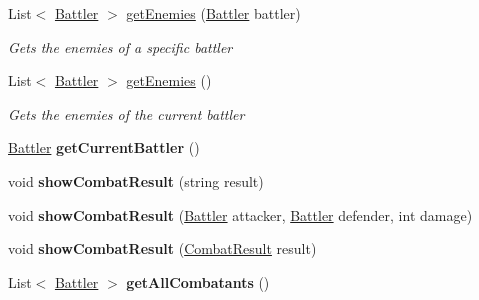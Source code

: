 \begin{DoxyCompactItemize}
\item 
List$<$ \hyperlink{class_simple_r_p_g_1_1_battler}{Battler} $>$ \hyperlink{class_simple_r_p_g_1_1_states_1_1_battle_state_a82c6a6de5de52d9586364607bb61d777}{get\-Enemies} (\hyperlink{class_simple_r_p_g_1_1_battler}{Battler} battler)
\begin{DoxyCompactList}\small\item\em Gets the enemies of a specific battler \end{DoxyCompactList}\item 
List$<$ \hyperlink{class_simple_r_p_g_1_1_battler}{Battler} $>$ \hyperlink{class_simple_r_p_g_1_1_states_1_1_battle_state_aafaee022fae4144c8606e7843db584fd}{get\-Enemies} ()
\begin{DoxyCompactList}\small\item\em Gets the enemies of the current battler \end{DoxyCompactList}\item 
\hypertarget{class_simple_r_p_g_1_1_states_1_1_battle_state_afea1b2b46a818c024abe7420daae1892}{\hyperlink{class_simple_r_p_g_1_1_battler}{Battler} {\bfseries get\-Current\-Battler} ()}\label{class_simple_r_p_g_1_1_states_1_1_battle_state_afea1b2b46a818c024abe7420daae1892}

\item 
\hypertarget{class_simple_r_p_g_1_1_states_1_1_battle_state_ab17e426b7d18e47c0f7f9bef8fc088dd}{void {\bfseries show\-Combat\-Result} (string result)}\label{class_simple_r_p_g_1_1_states_1_1_battle_state_ab17e426b7d18e47c0f7f9bef8fc088dd}

\item 
\hypertarget{class_simple_r_p_g_1_1_states_1_1_battle_state_ad4033eabfbc07f553de8888c4446a62f}{void {\bfseries show\-Combat\-Result} (\hyperlink{class_simple_r_p_g_1_1_battler}{Battler} attacker, \hyperlink{class_simple_r_p_g_1_1_battler}{Battler} defender, int damage)}\label{class_simple_r_p_g_1_1_states_1_1_battle_state_ad4033eabfbc07f553de8888c4446a62f}

\item 
\hypertarget{class_simple_r_p_g_1_1_states_1_1_battle_state_a30b8731548b6653aa0305bc7d7a2ee0b}{void {\bfseries show\-Combat\-Result} (\hyperlink{class_simple_r_p_g_1_1_combat_result}{Combat\-Result} result)}\label{class_simple_r_p_g_1_1_states_1_1_battle_state_a30b8731548b6653aa0305bc7d7a2ee0b}

\item 
\hypertarget{class_simple_r_p_g_1_1_states_1_1_battle_state_a94b60260339a45a2340e4c83d4ddcb0e}{List$<$ \hyperlink{class_simple_r_p_g_1_1_battler}{Battler} $>$ {\bfseries get\-All\-Combatants} ()}\label{class_simple_r_p_g_1_1_states_1_1_battle_state_a94b60260339a45a2340e4c83d4ddcb0e}


\end{DoxyCompactItemize}
